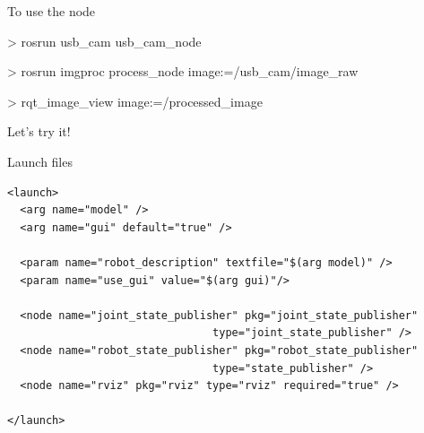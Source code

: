 \documentclass[compress]{beamer}
\begin{document}
\begin{frame}[fragile]{To use the node}


\begin{shcode}
> rosrun usb_cam usb_cam_node
\end{shcode}


\begin{shcode}
> rosrun imgproc process_node image:=/usb_cam/image_raw
\end{shcode}


\begin{shcode}
> rqt_image_view image:=/processed_image
\end{shcode}

\end{frame}


\begin{frame}[plain]
    \begin{center}
        \Large
    Let's try it!
    \end{center}
\end{frame}

\begin{frame}[fragile]{Launch files}

\begin{verbatim}
<launch>
  <arg name="model" />
  <arg name="gui" default="true" />

  <param name="robot_description" textfile="$(arg model)" />
  <param name="use_gui" value="$(arg gui)"/>

  <node name="joint_state_publisher" pkg="joint_state_publisher" 
                                type="joint_state_publisher" />
  <node name="robot_state_publisher" pkg="robot_state_publisher" 
                                type="state_publisher" />
  <node name="rviz" pkg="rviz" type="rviz" required="true" />

</launch>
\end{verbatim}


\end{frame}
\end{document}
